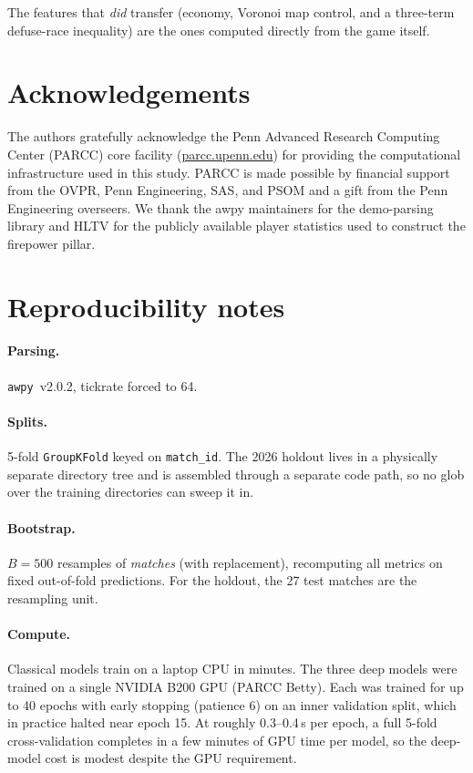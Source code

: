 \documentclass[11pt,a4paper]{article}
\begin{document}
The features that \emph{did} transfer (economy, Voronoi map control, and a three-term
defuse-race inequality) are the ones computed directly from the game itself.

\section*{Acknowledgements}
The authors gratefully acknowledge the Penn Advanced Research Computing Center (PARCC) core facility
(\url{parcc.upenn.edu}) for providing the computational infrastructure used in this study. PARCC is made
possible by financial support from the OVPR, Penn Engineering, SAS, and PSOM and a gift from the Penn
Engineering overseers. We thank the awpy maintainers for the demo-parsing library and HLTV for the
publicly available player statistics used to construct the firepower pillar.




\appendix

\section{Reproducibility notes}
\label{app:repro}

\paragraph{Parsing.} \texttt{awpy}~v2.0.2, tickrate forced to 64.

\paragraph{Splits.} 5-fold \texttt{GroupKFold} keyed on \texttt{match\_id}. The 2026 holdout lives
in a physically separate directory tree and is assembled through a separate code path, so no glob
over the training directories can sweep it in.

\paragraph{Bootstrap.} $B = 500$ resamples of \emph{matches} (with replacement), recomputing all
metrics on fixed out-of-fold predictions. For the holdout, the 27 test matches are the resampling
unit.

\paragraph{Compute.} Classical models train on a laptop CPU in minutes. The three deep models were
trained on a single NVIDIA B200 GPU (PARCC Betty). Each was trained for up to 40 epochs with early
stopping (patience 6) on an inner validation split, which in practice halted near epoch 15. At roughly
0.3--0.4\,s per epoch, a full 5-fold cross-validation completes in a few minutes of GPU time per model,
so the deep-model cost is modest despite the GPU requirement.
\end{document}
